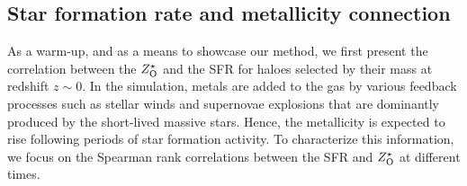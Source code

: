 \subsection{Star formation rate and metallicity connection}
\label{sec:sfr-metallicity}
As a warm-up, and as a means to showcase our method, we first present the correlation between the $Z^{\star}_{\rm{O}}$ and the SFR for haloes selected by their mass at redshift $z\sim 0$. 
In the simulation, metals are added to the gas by various feedback processes such as stellar winds and supernovae explosions that are dominantly produced by the short-lived massive stars. Hence, the metallicity is expected to rise following periods of star formation activity. To characterize this information, we focus on the Spearman rank correlations between the SFR and $Z^{\star}_{\rm{O}}$ at different times.

